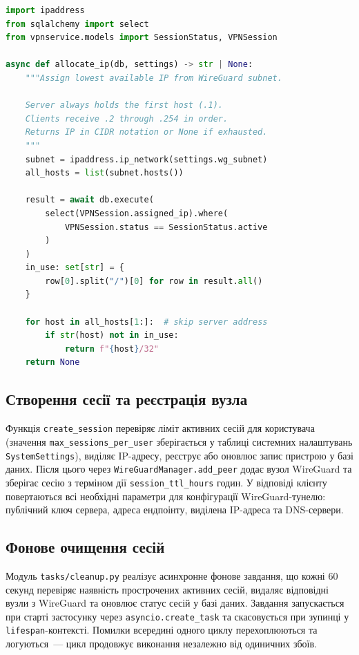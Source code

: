 \begin{lstlisting}[style=mystyle, language=Python,
  caption={Алокатор IP-адрес для підмережі WireGuard},
  label={lst:ip_allocator}]
import ipaddress
from sqlalchemy import select
from vpnservice.models import SessionStatus, VPNSession

async def allocate_ip(db, settings) -> str | None:
    """Assign lowest available IP from WireGuard subnet.

    Server always holds the first host (.1).
    Clients receive .2 through .254 in order.
    Returns IP in CIDR notation or None if exhausted.
    """
    subnet = ipaddress.ip_network(settings.wg_subnet)
    all_hosts = list(subnet.hosts())

    result = await db.execute(
        select(VPNSession.assigned_ip).where(
            VPNSession.status == SessionStatus.active
        )
    )
    in_use: set[str] = {
        row[0].split("/")[0] for row in result.all()
    }

    for host in all_hosts[1:]:  # skip server address
        if str(host) not in in_use:
            return f"{host}/32"
    return None
\end{lstlisting}

\subsection{Створення сесії та реєстрація вузла}

Функція \texttt{create\_session} перевіряє ліміт активних сесій для
користувача (значення \texttt{max\_sessions\_per\_user} зберігається у
таблиці системних налаштувань \texttt{SystemSettings}), виділяє IP-адресу,
реєструє або оновлює запис пристрою у базі даних. Після цього через
\texttt{WireGuardManager.add\_peer} додає вузол WireGuard та зберігає
сесію з терміном дії \texttt{session\_ttl\_hours} годин. У відповіді клієнту повертаються
всі необхідні параметри для конфігурації WireGuard-тунелю: публічний
ключ сервера, адреса ендпоінту, виділена IP-адреса та DNS-сервери.

\subsection{Фонове очищення сесій}

Модуль \texttt{tasks/cleanup.py} реалізує асинхронне фонове завдання,
що кожні 60 секунд перевіряє наявність прострочених активних сесій,
видаляє відповідні вузли з WireGuard та оновлює статус сесій у базі
даних. Завдання запускається при старті застосунку через
\texttt{asyncio.create\_task} та скасовується при зупинці у
\texttt{lifespan}-контексті. Помилки всередині одного циклу перехоплюються
та логуються~--- цикл продовжує виконання незалежно від одиничних збоїв.

